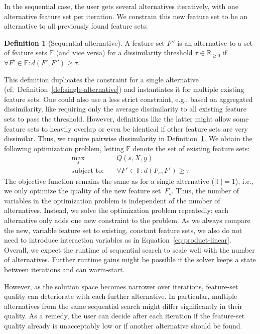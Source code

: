 \documentclass{article}
\theoremstyle{definition}
\newtheorem{definition}{Definition}
\begin{document}
In the sequential case, the user gets several alternatives iteratively, with one alternative feature set per iteration.
We constrain this new feature set to be an alternative to all previously found feature sets:
%
\begin{definition}[Sequential alternative]
	A feature set $F''$ is an alternative to a set of feature sets $\mathbb{F}$ (and vice versa) for a dissimilarity threshold $\tau \in \mathbb{R}_{\geq 0}$ if $\forall F' \in \mathbb{F}: d(F',F'') \geq \tau$.
	\label{def:sequential-alternative}
\end{definition}
%
This definition duplicates the constraint for a single alternative (cf.~Definition~\ref{def:single-alternative}) and instantiates it for multiple existing feature sets.
One could also use a less strict constraint, e.g., based on aggregated dissimilarity, like requiring only the average dissimilarity to all existing feature sets to pass the threshold.
However, definitions like the latter might allow some feature sets to heavily overlap or even be identical if other feature sets are very dissimilar.
Thus, we require pairwise dissimilarity in Definition~\ref{def:sequential-alternative}.
We obtain the following optimization problem, letting $\mathbb{F}$ denote the set of existing feature sets:
%
\begin{equation}
	\begin{aligned}
		\max_s &\quad Q(s,X,y) \\
		\text{subject to:} &\quad \forall F' \in \mathbb{F}: d(F_s,F') \geq \tau
	\end{aligned}
	\label{eq:afs-sequential}
\end{equation}
%
The objective function remains the same as for a single alternative ($|\mathbb{F}| = 1$), i.e., we only optimize the quality of the new feature set~$F_s$.
Thus, the number of variables in the optimization problem is independent of the number of alternatives.
Instead, we solve the optimization problem repeatedly; each alternative only adds one new constraint to the problem.
As we always compare the new, variable feature set to existing, constant feature sets, we also do not need to introduce interaction variables as in Equation~\ref{eq:product-linear}.
Overall, we expect the runtime of sequential search to scale well with the number of alternatives.
Further runtime gains might be possible if the solver keeps a state between iterations and can warm-start.

However, as the solution space becomes narrower over iterations, feature-set quality can deteriorate with each further alternative.
In particular, multiple alternatives from the same sequential search might differ significantly in their quality.
As a remedy, the user can decide after each iteration if the feature-set quality already is unacceptably low or if another alternative should be found.
\end{document}
